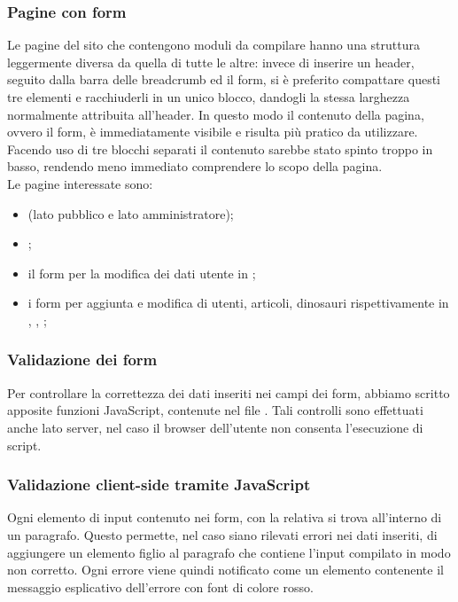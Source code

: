 \documentclass[12pt]{article}
\begin{document}
	\subsubsection{Pagine con form}
	Le pagine del sito che contengono moduli da compilare hanno una struttura leggermente diversa da quella di tutte le altre: invece di inserire un header, seguito dalla barra delle breadcrumb ed il form, si è preferito compattare questi tre elementi e racchiuderli in un unico blocco, dandogli la stessa larghezza normalmente attribuita all'header. 
	In questo modo il contenuto della pagina, ovvero il form, è immediatamente visibile e risulta più pratico da utilizzare.\\Facendo uso di tre blocchi separati il contenuto sarebbe stato spinto troppo in basso, rendendo meno immediato comprendere lo scopo della pagina.\\
	Le pagine interessate sono:
	\begin{itemize}
		\item {} (lato pubblico e lato amministratore);
		\item {};
		\item il form per la modifica dei dati utente in ; 
		\item i form per aggiunta e modifica di utenti, articoli, dinosauri rispettivamente in , , ;
	\end{itemize}
	
	\subsubsection{Validazione dei form} \label{ssec:validazioneform}
	Per controllare la correttezza dei dati inseriti nei campi dei form, abbiamo scritto apposite funzioni JavaScript, contenute nel file . Tali controlli sono effettuati anche lato server, nel caso il browser dell'utente non consenta l'esecuzione di script.
	
	\subsubsection*{Validazione client-side tramite JavaScript}
	Ogni elemento di input contenuto nei form, con la relativa  si trova all'interno di un paragrafo. Questo permette, nel caso siano rilevati errori nei dati inseriti, di aggiungere un elemento figlio al paragrafo che contiene l'input compilato in modo non corretto.
	Ogni errore viene quindi notificato come un elemento  contenente il messaggio esplicativo dell'errore con font di colore rosso.\\
	
\end{document}
